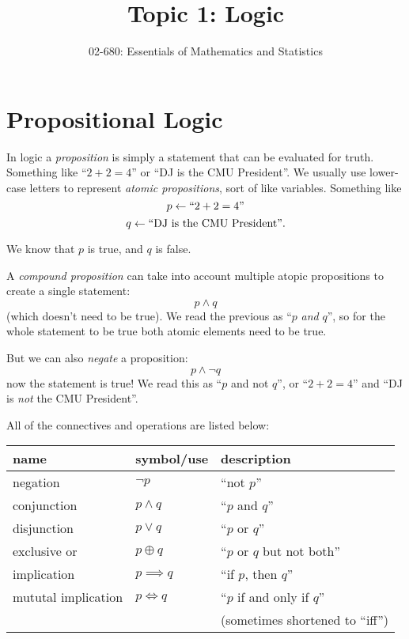 \documentclass[11pt, oneside]{article}   	%
\title{Topic 1:  Logic}
\author{02-680: Essentials of Mathematics and Statistics}
\begin{document}
\maketitle

\section{Propositional Logic}
In logic a \emph{proposition} is simply a statement that can be evaluated for truth. 
Something like ``$2+2=4$'' or ``DJ is the CMU President''. 
We usually use lower-case letters to represent \emph{atomic propositions}, sort of like variables. 
Something like 
\[ p \leftarrow \textnormal{``}2+2=4\textnormal{''}\]
\[ q \leftarrow \textnormal{``DJ is the CMU President''}.\]

We know that $p$ is true, and $q$ is false. 

A \emph{compound proposition} can take into account multiple atopic propositions to create a single statement: 
\[ p \wedge q \]
(which doesn't need to be true). 
We read the previous as ``$p$ \textit{and} $q$'', 
so for the whole statement to be true both atomic elements need to be true. 
 
But we can also \textit{negate} a proposition: 
\[ p \wedge \neg q \]
now the statement is true! 
We read this as ``$p$ and not $q$'', 
or  ``$2+2=4$'' and  ``DJ is \emph{not} the CMU President''.

All of the connectives and operations are listed below: 
\begin{center}
\begin{tabular}{lll}
name 		& symbol/use 		& description\\
\hline 
\hline
negation			& $\neg p$		& ``not $p$''\\
\hline
conjunction		& $p \wedge q$		& ``$p$ and $q$''\\
disjunction		& $p \vee q$		& ``$p$ or $q$''\\
exclusive or		& $p \oplus q$		& ``$p$ or $q$ but not both''\\
\hline
implication		& $p \implies q$	& ``if $p$, then $q$''\\
mututal implication 	& $p \iff q$		& ``$p$ if and only if $q$'' \\
				&				& \hspace{3em}(sometimes shortened to ``iff'')\\
\hline
\end{tabular}
\end{center}
\end{document}
